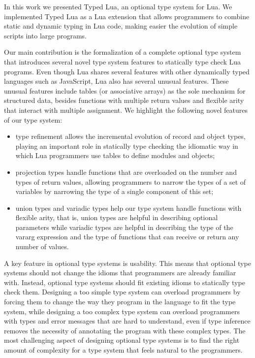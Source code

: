In this work we presented Typed Lua, an optional type system for Lua.
We implemented Typed Lua as a Lua extension that allows programmers to
combine static and dynamic typing in Lua code, making easier the evolution
of simple scripts into large programs.

Our main contribution is the formalization of a complete optional type
system that introduces several novel type system features to statically
type check Lua programs.
Even though Lua shares several features with other dynamically
typed languages such as JavaScript, Lua also has several unusual features.
These unusual features include tables (or associative arrays) as the sole
mechanism for structured data, besides functions with multiple return values
and flexible arity that interact with multiple assignment.
We highlight the following novel features of our type system:
\begin{itemize}
\item type refinement allows the incremental evolution of record and
object types, playing an important role in statically type checking
the idiomatic way in which Lua programmers use tables to define modules
and objects;
\item projection types handle functions that are overloaded on the
number and types of return values, allowing programmers to narrow the
types of a set of variables by narrowing the type of a single component
of this set;
\item union types and variadic types help our type system handle
functions with flexible arity, that is, union types are helpful in
describing optional parameters while variadic types are helpful in
describing the type of the vararg expression and the type of functions
that can receive or return any number of values.
\end{itemize}

A key feature in optional type systems is usability.
This means that optional type systems should not change the idioms
that programmers are already familiar with.
Instead, optional type systems should fit existing idioms to
statically type check them.
Designing a too simple type system can overload programmers by forcing
them to change the way they program in the language to fit the type system,
while designing a too complex type system can overload programmers with
types and error messages that are hard to understand, even if type inference
removes the necessity of annotating the program with these complex types.
The most challenging aspect of designing optional type systems is to find
the right amount of complexity for a type system that feels natural to the programmers.

